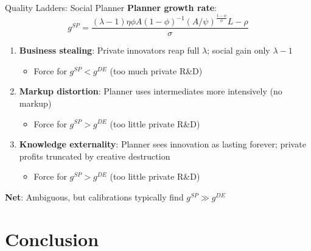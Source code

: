\documentclass[blue]{beamer}
\begin{document}
		
		\begin{frame}{Quality Ladders: Social Planner}
			\textbf{Planner growth rate}:
			\[
			g^{SP} = \frac{(\lambda-1)\eta\phi A(1-\phi)^{-1}(A/\psi)^{\frac{1-\phi}{\phi}} L - \rho}{\sigma}
			\]

			\begin{enumerate}
				\item \textbf{Business stealing}: Private innovators reap full $\lambda$; social gain only $\lambda - 1$
				\begin{itemize}
					\item Force for $g^{SP} < g^{DE}$ (too much private R\&D)
				\end{itemize}
				\item \textbf{Markup distortion}: Planner uses intermediates more intensively (no markup)
				\begin{itemize}
					\item Force for $g^{SP} > g^{DE}$ (too little private R\&D)
				\end{itemize}
				\item \textbf{Knowledge externality}: Planner sees innovation as lasting forever; private profits truncated by creative destruction
				\begin{itemize}
					\item Force for $g^{SP} > g^{DE}$ (too little private R\&D)
				\end{itemize}
			\end{enumerate}
			
			\textbf{Net}: Ambiguous, but calibrations typically find $g^{SP} \gg g^{DE}$
		\end{frame}
		
		\section{Conclusion}
		
\end{document}
